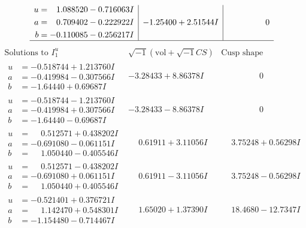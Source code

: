 \documentclass[1p]{elsarticle_modified}
\theoremstyle{definition}
\newcommand{\I}{\sqrt{-1}}
\begin{document}
$$\begin{array}{c|c|c}
\begin{aligned}
u &= \phantom{-}1.088520 - 0.716063 I \\
a &= \phantom{-}0.709402 - 0.222922 I \\
b &= -0.110085 - 0.256217 I\end{aligned}
 & -1.25400 + 2.51544 I & \phantom{-0.000000 } 0\\
 \hline 
 \end{array}$$\newpage$$\begin{array}{c|c|c}  
\text{Solutions to }I^u_{1}& \I (\text{vol} + \sqrt{-1}CS) & \text{Cusp shape}\\
 \hline 
\begin{aligned}
u &= -0.518744 + 1.213760 I \\
a &= -0.419984 - 0.307566 I \\
b &= -1.64440 + 0.69687 I\end{aligned}
 & -3.28433 + 8.86378 I & \phantom{-0.000000 } 0 \\ \hline\begin{aligned}
u &= -0.518744 - 1.213760 I \\
a &= -0.419984 + 0.307566 I \\
b &= -1.64440 - 0.69687 I\end{aligned}
 & -3.28433 - 8.86378 I & \phantom{-0.000000 } 0 \\ \hline\begin{aligned}
u &= \phantom{-}0.512571 + 0.438202 I \\
a &= -0.691080 - 0.061151 I \\
b &= \phantom{-}1.050440 - 0.405546 I\end{aligned}
 & \phantom{-}0.61911 + 3.11056 I & \phantom{-}3.75248 + 0.56298 I \\ \hline\begin{aligned}
u &= \phantom{-}0.512571 - 0.438202 I \\
a &= -0.691080 + 0.061151 I \\
b &= \phantom{-}1.050440 + 0.405546 I\end{aligned}
 & \phantom{-}0.61911 - 3.11056 I & \phantom{-}3.75248 - 0.56298 I \\ \hline\begin{aligned}
u &= -0.521401 + 0.376721 I \\
a &= \phantom{-}1.142470 + 0.548301 I \\
b &= -1.154480 - 0.714467 I\end{aligned}
 & \phantom{-}1.65020 + 1.37390 I & \phantom{-}18.4680 - 12.7347 I \\ \hline\begin{aligned}

\end{aligned}
\end{array}$$
\end{document}
